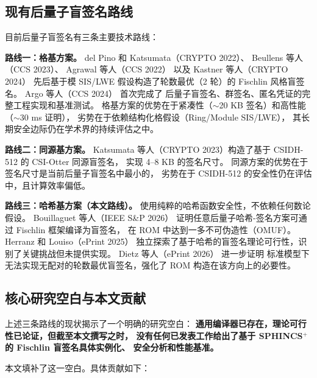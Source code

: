 \documentclass[11pt,a4paper]{ctexart}
\begin{document}
\subsection{现有后量子盲签名路线}

目前后量子盲签名有三条主要技术路线：

\textbf{路线一：格基方案。}
del Pino 和 Katsumata（CRYPTO 2022）\cite{delPino2022Framework}、
Beullens 等人（CCS 2023）\cite{Beullens2023LatticeBlind}、
Agrawal 等人（CCS 2022）\cite{Agrawal2022Practical} 以及
Kastner 等人（CRYPTO 2024）\cite{Kastner2024PairingFree}
先后基于模 SIS/LWE 假设构造了轮数最优（2 轮）的 Fischlin 风格盲签名。
Argo 等人（CCS 2024）\cite{Argo2024PracticalPQ} 首次完成了
后量子盲签名、群签名、匿名凭证的完整工程实现和基准测试。
格基方案的优势在于紧凑性（$\sim$20 KB 签名）和高性能（$\sim$30 ms 证明），
劣势在于依赖结构化格假设（Ring/Module SIS/LWE），
其长期安全边际仍在学术界的持续评估之中。

\textbf{路线二：同源基方案。}
Katsumata 等人（CRYPTO 2023）构造了基于 CSIDH-512 的 CSI-Otter 同源盲签名，
实现 4--8 KB 的签名尺寸。
同源方案的优势在于签名尺寸是当前后量子盲签名中最小的，
劣势在于 CSIDH-512 的安全性仍在评估中，且计算效率偏低。

\textbf{路线三：哈希基方案（本文路线）。}
使用纯粹的哈希函数安全性，不依赖任何数论假设。
Bouillaguet 等人（IEEE S\&P 2026）\cite{Bouillaguet2026BlindingPH}
证明任意后量子哈希-签名方案可通过 Fischlin 框架编译为盲签名，
在 ROM 中达到一多不可伪造性（OMUF）。
Herranz 和 Louiso（ePrint 2025）\cite{Herranz2025HashBased}
独立探索了基于哈希的盲签名理论可行性，识别了关键挑战但未提供实现。
Dietz 等人（ePrint 2026）\cite{Dietz2026Impossibility} 进一步证明
标准模型下无法实现无配对的轮数最优盲签名，强化了 ROM 构造在该方向上的必要性。

\subsection{核心研究空白与本文贡献}

上述三条路线的现状揭示了一个明确的研究空白：
\textbf{通用编译器已存在，理论可行性已论证，但截至本文撰写之时，
没有任何已发表工作给出了基于 SPHINCS$^+$ 的 Fischlin 盲签名具体实例化、
安全分析和性能基准。}

本文填补了这一空白。具体贡献如下：
\end{document}
